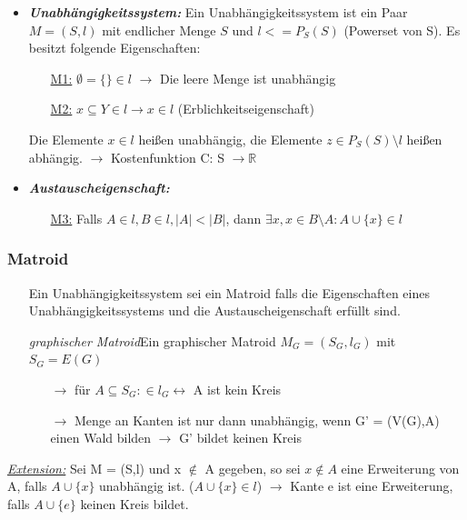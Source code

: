\begin{itemize}
	\item \textbf{\textit{Unabhängigkeitssystem:}} \newline Ein Unabhängigkeitssystem ist ein Paar $M = (S,l)$ mit endlicher Menge $S$ und $l <= P_S(S)$ (Powerset von S). Es besitzt folgende Eigenschaften:
	\begin{itemize}
		\item[\underline{M1:}] $\emptyset = \{\} \in l$ $\rightarrow$ Die leere Menge ist unabhängig
		\item[\underline{M2:}] $x \subseteq Y \in l \rightarrow x \in l$ (Erblichkeitseigenschaft)
	\end{itemize}
	Die Elemente $x \in l$ heißen unabhängig, die Elemente $z \in P_S(S) \setminus l$ heißen abhängig. \newline
	$\rightarrow$ Kostenfunktion C: S $\rightarrow \mathbb{R}$ 
	\item \textbf{\textit{Austauscheigenschaft:}}
	\begin{itemize}
		\item [\underline{M3:}] Falls $A \in l, B \in l, |A| < |B|$, dann $\exists x, x \in B \setminus A: A \cup \{x\} \in l$
	\end{itemize}
\end{itemize}

\subsubsection{Matroid}
\begin{itemize}
	\item[] Ein Unabhängigkeitssystem sei ein Matroid falls die Eigenschaften eines Unabhängigkeitssystems und die Austauscheigenschaft erfüllt sind.
	\item[] \textit{graphischer Matroid}\newline Ein graphischer Matroid $M_G = (S_G,l_G)$ mit $S_G = E(G)$
	\begin{itemize}
		\item[$\rightarrow$] für $A \subseteq S_G: \in l_G \leftrightarrow$ A ist kein Kreis
		\item[$\rightarrow$] Menge an Kanten ist nur dann unabhängig, wenn G' = (V(G),A) einen Wald bilden $\rightarrow$ G' bildet keinen Kreis
	\end{itemize}
\end{itemize}

\underline{\textit{Extension:}} \newline Sei M = (S,l) und x $\notin$ A gegeben, so sei $x \not \in A$ eine Erweiterung von A, falls $A \cup \{x\}$ unabhängig ist. ($A \cup \{x\}\in l$) \newline  $\rightarrow$ Kante e ist eine Erweiterung, falls $A \cup \{e\}$ keinen Kreis bildet. \newline

